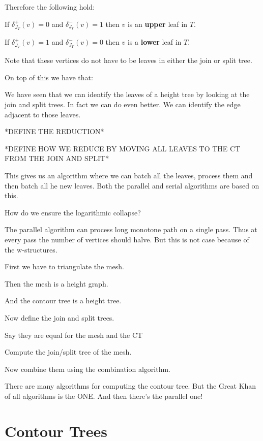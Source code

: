 Therefore the following hold:

\begin{lem} If $\delta_{J_T}^+(v) = 0$ and $\delta_{J_T}^-(v) = 1$ then $v$ is an \textbf{upper} leaf in $T$.\end{lem}
\begin{lem} If $\delta_{J_T}^+(v) = 1$ and $\delta_{J_T}^-(v) = 0$ then $v$ is a \textbf{lower} leaf in $T$.\end{lem}

Note that these vertices do not have to be leaves in either the join or split tree.

On top of this we have that:

We have seen that we can identify the leaves of a height tree by looking at the join and split trees. In fact we can do even better. We can identify the edge adjacent to those leaves.

*DEFINE THE REDUCTION*

*DEFINE HOW WE REDUCE BY MOVING ALL LEAVES TO THE CT FROM THE JOIN AND SPLIT*

This gives us an algorithm where we can batch all the leaves, process them and then batch all he new leaves. Both the parallel and serial algorithms are based on this.

How do we ensure the logarithmic collapse?

The parallel algorithm can process long monotone path on a single pass. Thus at every pass the number of vertices should halve. But this is not case because of the w-structures.










First we have to triangulate the mesh.

Then the mesh is a height graph.

And the contour tree is a height tree.

Now define the join and split trees.

Say they are equal for the mesh and the CT

Compute the join/split tree of the mesh.

Now combine them using the combination algorithm.

There are many algorithms for computing the contour tree. But the Great Khan of all algorithms is the ONE. And then there's the parallel one!


\section{Contour Trees}

